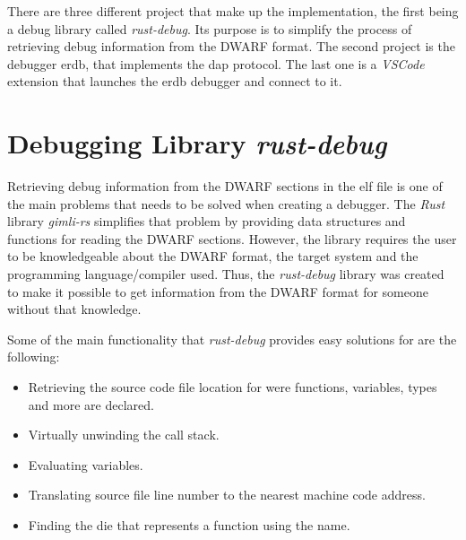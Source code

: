  


There are three different project that make up the implementation, the first being a debug library called \emph{rust-debug}.
Its purpose is to simplify the process of retrieving debug information from the \gls{DWARF} format.
The second project is the debugger \gls{erdb}, that implements the \gls{dap} protocol.
The last one is a \emph{VSCode} extension that launches the \gls{erdb} debugger and connect to it.


\section{Debugging Library \emph{rust-debug}}
\label{section:rust-debug}

Retrieving debug information from the \gls{DWARF} sections in the \gls{elf} file is one of the main problems that needs to be solved when creating a debugger.
The \emph{Rust} library \emph{gimli-rs} simplifies that problem by providing data structures and functions for reading the \gls{DWARF} sections.
However, the library requires the user to be knowledgeable about the \gls{DWARF} format, the target system and the programming language/compiler used.
Thus, the \emph{rust-debug} library was created to make it possible to get information from the \gls{DWARF} format for someone without that knowledge.

Some of the main functionality that \emph{rust-debug} provides easy solutions for are the following:

\begin{itemize}
  \item Retrieving the source code file location for were functions, variables, types and more are declared.
  \item Virtually unwinding the call stack.
  \item Evaluating variables.
  \item Translating source file line number to the nearest machine code address.
  \item Finding the \gls{die} that represents a function using the name.
\end{itemize}

